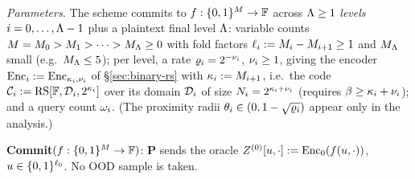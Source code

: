 \begin{protocol}\label{fig:protocol}
\ \par\smallskip
\emph{Parameters.} The scheme commits to $f : \{0,1\}^{M} \to \mathbb{F}$ across $\Lambda \ge 1$ \emph{levels} $i = 0, \dots, \Lambda-1$ plus a plaintext final level $\Lambda$: variable counts $M = M_0 > M_1 > \dots > M_\Lambda \ge 0$ with fold factors $\ell_i := M_i - M_{i+1} \ge 1$ and $M_\Lambda$ small (e.g.\ $M_\Lambda \le 5$); per level, a rate $\varrho_i = 2^{-\nu_i}$, $\nu_i \ge 1$, giving the encoder $\mathrm{Enc}_i := \mathrm{Enc}_{\kappa_i, \nu_i}$ of \S\ref{sec:binary-rs} with $\kappa_i := M_{i+1}$, i.e.\ the code $\mathcal{C}_i := \mathrm{RS}[\mathbb{F}, \mathcal{D}_i, 2^{\kappa_i}]$ over its domain $\mathcal{D}_i$ of size $N_i = 2^{\kappa_i + \nu_i}$ (requires $\beta \ge \kappa_i + \nu_i$); and a query count $\omega_i$. (The proximity radii $\theta_i \in (0, 1 - \sqrt{\varrho_i})$ appear only in the analysis.)

\smallskip
\textbf{Commit}$(f : \{0,1\}^{M} \to \mathbb{F})$: $\mathbf{P}$ sends the oracle $Z^{(0)}[u, \cdot] := \mathrm{Enc}_0(f(u, \cdot))$, $u \in \{0,1\}^{\ell_0}$. No OOD sample is taken.


\end{protocol}
